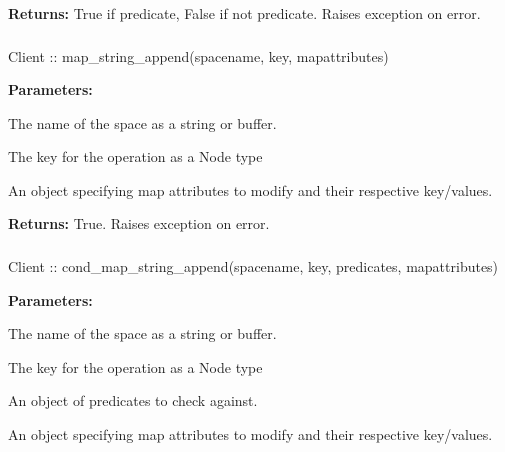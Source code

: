 \noindent\textbf{Returns:}
True if predicate, False if not predicate.  Raises exception on error.

\subsubsection{}
\label{api:nodejs:map_string_append}
\begin{javascriptcode}
Client :: map_string_append(spacename, key, mapattributes)
\end{javascriptcode}


\noindent\textbf{Parameters:}
\begin{description}[labelindent=\widthof{{\code{mapattributes}}},leftmargin=*,noitemsep,nolistsep,align=right]
\item[\code{spacename}] The name of the space as a string or buffer.
\item[\code{key}] The key for the operation as a Node type
\item[\code{mapattributes}] An object specifying map attributes to modify and their respective key/values.
\end{description}

\noindent\textbf{Returns:}
True.  Raises exception on error.

\subsubsection{}
\label{api:nodejs:cond_map_string_append}
\begin{javascriptcode}
Client :: cond_map_string_append(spacename, key, predicates, mapattributes)
\end{javascriptcode}


\noindent\textbf{Parameters:}
\begin{description}[labelindent=\widthof{{\code{mapattributes}}},leftmargin=*,noitemsep,nolistsep,align=right]
\item[\code{spacename}] The name of the space as a string or buffer.
\item[\code{key}] The key for the operation as a Node type
\item[\code{predicates}] An object of predicates to check against.
\item[\code{mapattributes}] An object specifying map attributes to modify and their respective key/values.
\end{description}

